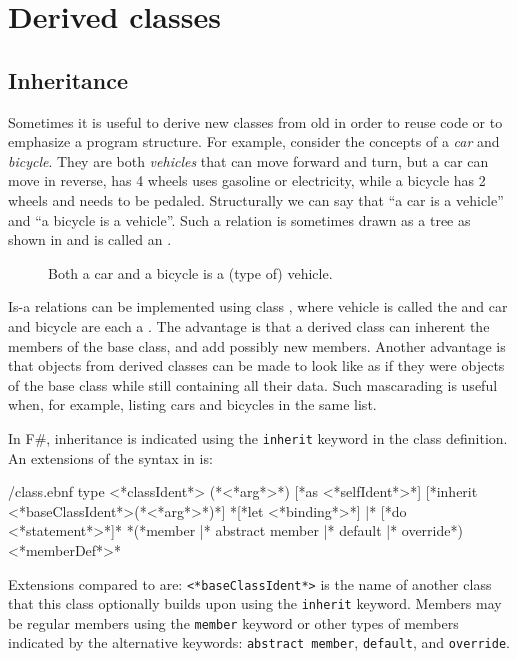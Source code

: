 \chapter{Derived classes}
\label{chap:derivedClasses}
\section{Inheritance}
\label{sec:inheritance}
Sometimes it is useful to derive new classes from old in order to reuse code or to emphasize a program structure. For example, consider the concepts of a \emph{car} and \emph{bicycle}. They are both \emph{vehicles} that can move forward and turn, but a car can move in reverse, has 4 wheels uses gasoline or electricity, while a bicycle has 2 wheels and needs to be pedaled. Structurally we can say that ``a car is a vehicle'' and ``a bicycle is a vehicle''. Such a relation is sometimes drawn as a tree as shown in  and is called an .
%
\begin{figure}[h]
  \centering
  \caption{Both a car and a bicycle is a (type of) vehicle.}
  \label{fig:inheritanceVehicle}
\end{figure}
%
Is-a relations can be implemented using class , where vehicle is called the  and car and bicycle are each a . The advantage is that a derived class can inherent the members of the base class,  and add possibly new members. Another advantage is that objects from derived classes can be made to look like as if they were objects of the base class while still containing all their data. Such mascarading is useful when, for example, listing cars and bicycles in the same list.

In F\#, inheritance is indicated using the \lstinline[language=syntax]{inherit} keyword in the class definition. An extensions of the syntax in  is:
%
\begin{verbatimwrite}{\ebnf/class.ebnf}
type <*classIdent*> ({*<*arg*>*}) [*as <*selfIdent*>*] 
  [*inherit <*baseClassIdent*>({*<*arg*>*})*]
  {*[*let <*binding*>*] |* [*do <*statement*>*]*}
  {*(*member |* abstract member |* default |* override*) <*memberDef*>*}
\end{verbatimwrite}
%
Extensions compared to  are: \lstinline[language=syntax]{<*baseClassIdent*>} is the name of another class that this class optionally builds upon using the \lstinline{inherit} keyword. Members may be regular members using the \lstinline{member} keyword or other types of members indicated by the alternative keywords: \lstinline{abstract member}, \lstinline{default}, and \lstinline{override}.


